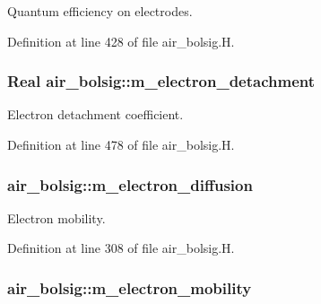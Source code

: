 Quantum efficiency on electrodes. 



Definition at line 428 of file air\+\_\+bolsig.\+H.

\subsubsection[{\texorpdfstring{m\+\_\+electron\+\_\+detachment}{m_electron_detachment}}]{\setlength{\rightskip}{0pt plus 5cm}Real air\+\_\+bolsig\+::m\+\_\+electron\+\_\+detachment\hspace{0.3cm}{\ttfamily [protected]}}\hypertarget{classair__bolsig_a447de9cb37db42cfc15e1b1489f88d64}{}\label{classair__bolsig_a447de9cb37db42cfc15e1b1489f88d64}


Electron detachment coefficient. 



Definition at line 478 of file air\+\_\+bolsig.\+H.

\subsubsection[{\texorpdfstring{m\+\_\+electron\+\_\+diffusion}{m_electron_diffusion}}]{ air\+\_\+bolsig\+::m\+\_\+electron\+\_\+diffusion\hspace{0.3cm}{\ttfamily [protected]}}\hypertarget{classair__bolsig_a31fb3dcd9d0361d5e5976d42a34896de}{}\label{classair__bolsig_a31fb3dcd9d0361d5e5976d42a34896de}


Electron mobility. 



Definition at line 308 of file air\+\_\+bolsig.\+H.

\subsubsection[{\texorpdfstring{m\+\_\+electron\+\_\+mobility}{m_electron_mobility}}]{ air\+\_\+bolsig\+::m\+\_\+electron\+\_\+mobility\hspace{0.3cm}{\ttfamily [protected]}}\hypertarget{classair__bolsig_aa5bd233930889b89de840527be0d0238}{}\label{classair__bolsig_aa5bd233930889b89de840527be0d0238}


